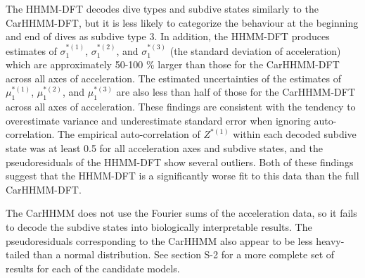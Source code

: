The HHMM-DFT decodes dive types and subdive states similarly to the CarHHMM-DFT, but it is less likely to categorize the behaviour at the beginning and end of dives as subdive type 3. In addition, the HHMM-DFT produces estimates of $\sigma_1^{*(1)}$, $\sigma_1^{*(2)}$, and $\sigma_1^{*(3)}$ (the standard deviation of acceleration) which are approximately 50-100 \% larger than those for the CarHHMM-DFT across all axes of acceleration. The estimated uncertainties of the estimates of $\mu_1^{*(1)}$, $\mu_1^{*(2)}$, and $\mu_1^{*(3)}$ are also less than half of those for the CarHHMM-DFT across all axes of acceleration. These findings are consistent with the tendency to overestimate variance and underestimate standard error when ignoring auto-correlation. The empirical auto-correlation of $Z^{*(1)}$ within each decoded subdive state was at least 0.5 for all acceleration axes and subdive states, and the pseudoresiduals of the HHMM-DFT show several outliers. Both of these findings suggest that the HHMM-DFT is a significantly worse fit to this data than the full CarHHMM-DFT.

The CarHHMM does not use the Fourier sums of the acceleration data, so it fails to decode the subdive states into biologically interpretable results. The pseudoresiduals corresponding to the CarHHMM also appear to be less heavy-tailed than a normal distribution. See section S-2 for a more complete set of results for each of the candidate models.